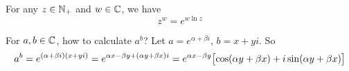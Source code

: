 \begin{theorem}
    For any $z \in \mathbb{N}_{+}$ and $w \in \mathbb{C}$, we have
    \begin{equation}
        z^w = e^{w \ln z}
    \end{equation}
\end{theorem}

\begin{theorem}
    For $a, b \in \mathbb{C}$, how to calculate $a^b$? Let $a = e^{\alpha + \beta i}$, $b = x + yi$. So
    \begin{equation}
        a^b = e^{(\alpha + \beta i) (x + yi)} = e^{\alpha x - \beta y + (\alpha y + \beta x)i} = e^{\alpha x - \beta y} \mleft[\cos (\alpha y + \beta x) + i \sin (\alpha y + \beta x)\mright ]
    \end{equation}
\end{theorem}
















































































